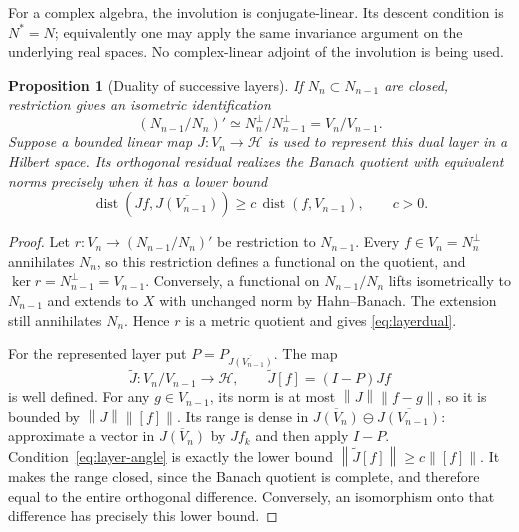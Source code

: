 \documentclass[11pt,a4paper]{amsart}
\numberwithin{equation}{section}
\newtheorem{proposition}[theorem]{Proposition}
\theoremstyle{definition}
\theoremstyle{remark}
\newcommand{\HH}{\mathcal H}
\DeclareMathOperator{\dist}{dist}
\newcommand{\norm}[1]{\left\lVert#1\right\rVert}
\begin{document}
For a complex algebra, the involution is conjugate-linear. Its descent condition is $N^*=N$; equivalently one may apply the same invariance argument on the underlying real spaces. No complex-linear adjoint of the involution is being used.

\begin{proposition}[Duality of successive layers]\label{prop:layerdual}
If $N_n\subset N_{n-1}$ are closed, restriction gives an isometric identification
\begin{equation}\label{eq:layerdual}
 (N_{n-1}/N_n)'\simeq N_n^\perp/N_{n-1}^\perp=V_n/V_{n-1}.
\end{equation}
Suppose a bounded linear map $J:V_n\to\HH$ is used to represent this dual layer in a Hilbert space. Its orthogonal residual realizes the Banach quotient with equivalent norms precisely when it has a lower bound
\begin{equation}\label{eq:layer-angle}
 \dist(Jf,\overline{J(V_{n-1})})
 \ge c\,\dist(f,V_{n-1}),\qquad c>0.
\end{equation}
\end{proposition}
\begin{proof}
Let $r:V_n\to(N_{n-1}/N_n)'$ be restriction to $N_{n-1}$. Every $f\in V_n=N_n^\perp$ annihilates $N_n$, so this restriction defines a functional on the quotient, and $\ker r=N_{n-1}^\perp=V_{n-1}$. Conversely, a functional on $N_{n-1}/N_n$ lifts isometrically to $N_{n-1}$ and extends to $X$ with unchanged norm by Hahn--Banach. The extension still annihilates $N_n$. Hence $r$ is a metric quotient and gives \eqref{eq:layerdual}.

For the represented layer put $P=P_{\overline{J(V_{n-1})}}$. The map
\[
 \widetilde J:V_n/V_{n-1}\longrightarrow\HH,
 \qquad \widetilde J[f]=(I-P)Jf
\]
is well defined. For any $g\in V_{n-1}$, its norm is at most $\norm J\norm{f-g}$, so it is bounded by $\norm J\norm{[f]}$. Its range is dense in
$\overline{J(V_n)}\ominus\overline{J(V_{n-1})}$: approximate a vector in $\overline{J(V_n)}$ by $Jf_k$ and then apply $I-P$. Condition~\eqref{eq:layer-angle} is exactly the lower bound $\norm{\widetilde J[f]}\ge c\norm{[f]}$. It makes the range closed, since the Banach quotient is complete, and therefore equal to the entire orthogonal difference. Conversely, an isomorphism onto that difference has precisely this lower bound.
\end{proof}
\end{document}
